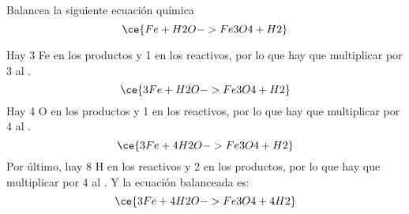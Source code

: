 Balancea la siguiente ecuación química
\[  \ce{Fe + H2O -> Fe3O4 + H2}\]

\begin{solutionbox}{7cm}
    Hay 3 Fe en los productos y 1 en los reactivos, por lo que hay que multiplicar por 3 al .
    \[  \ce{3Fe + H2O -> Fe3O4 + H2} \]
    Hay 4 O en los productos y 1 en los reactivos, por lo que hay que multiplicar por 4 al .
    \[    \ce{3Fe + 4H2O -> Fe3O4 + H2}\]
    Por último, hay 8 H en los reactivos y 2 en los productos, por lo que hay que multiplicar por 4 al . Y la ecuación balanceada es:
    \[     \ce{3Fe + 4H2O -> Fe3O4 + 4H2}  \]
\end{solutionbox}